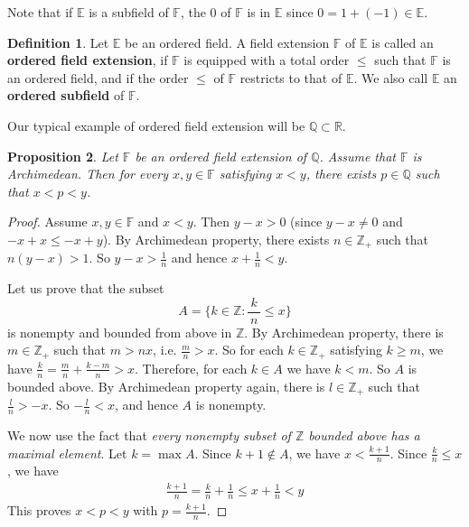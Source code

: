 \documentclass[12pt,b5paper,notitlepage]{article}
\theoremstyle{definition}
\newtheorem{df}{Definition}[section]
\theoremstyle{plain}
\newtheorem{pp}[df]{Proposition}
\newcommand{\Zbb}{\mathbb Z}
\newcommand{\Qbb}{\mathbb Q}
\newcommand{\Rbb}{\mathbb R}
\newcommand{\Ebb}{\mathbb E}
\newcommand{\Fbb}{\mathbb F}
\numberwithin{equation}{section}
\begin{document}
Note that if $\Ebb$ is a subfield of $\Fbb$, the $0$ of $\Fbb$ is in $\Ebb$ since $0=1+(-1)\in\Ebb$.

\begin{df}
Let $\Ebb$ be an ordered field. A field extension $\Fbb$ of $\Ebb$ is called an  \textbf{ordered field extension}, if $\Fbb$ is equipped with a total order $\leq$ such that $\Fbb$ is an ordered field, and if the order $\leq$ of $\Fbb$ restricts to that of $\Ebb$. We also call $\Ebb$ an \textbf{ordered subfield} of $\Fbb$.
\end{df}

Our typical example of ordered field extension will be $\Qbb\subset\Rbb$.

\begin{pp}\label{lb2}
Let $\Fbb$ be an ordered field extension  of $\Qbb$. Assume that $\Fbb$ is Archimedean. Then for every $x,y\in\Fbb$ satisfying $x<y$, there exists $p\in\Qbb$ such that $x<p<y$.
\end{pp}

\begin{proof}
Assume $x,y\in\Fbb$ and $x<y$. Then $y-x>0$ (since $y-x\neq 0$ and $-x+x\leq -x+y$). By Archimedean property, there exists $n\in\Zbb_+$ such that $n(y-x)>1$. So $\displaystyle y-x>\frac 1n$ and hence $\displaystyle x+\frac 1n<y$.

Let us prove that the subset
\begin{equation*}
A=\big\{k\in\Zbb: \frac {~k~}{n}\leq x\big\}
\end{equation*}
is nonempty and bounded from above in $\Zbb$. By Archimedean property, there is $m\in\Zbb_+$ such that $m>nx$, i.e. $\displaystyle \frac mn>x$. So for each $k\in\Zbb_+$ satisfying $k\geq m$, we have $\displaystyle \frac kn=\frac mn+\frac{k-m}n>x$. Therefore, for each $k\in A$ we have $k<m$. So $A$ is bounded above. By Archimedean property again, there is $l\in\Zbb_+$ such that $\displaystyle \frac ln>-x$. So $\displaystyle -\frac ln<x$, and hence $A$ is nonempty.

We now use the fact that \textit{every nonempty subset of $\Zbb$ bounded above has a maximal element}. Let $k=\max A$. Since $k+1\notin A$, we have $\displaystyle x<\frac{k+1}n$. Since $\displaystyle \frac kn\leq x$, we have
\begin{align*}
\frac{k+1}n=\frac kn+\frac 1n\leq x+\frac 1n<y
\end{align*}
This proves $x<p<y$ with $\displaystyle p=\frac{k+1}n$.
\end{proof}
\end{document}
